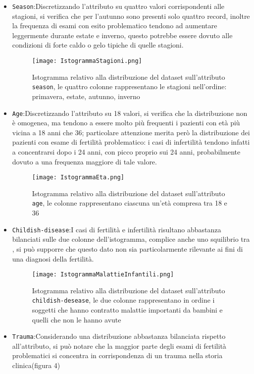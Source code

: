 \begin{itemize}
	\item \texttt{Season}:Discretizzando l'attributo su quattro valori corrispondenti alle stagioni, si verifica che per l'autunno sono presenti solo quattro record, inoltre la frequenza di esami con esito problematico tendono ad aumentare leggermente durante estate e inverno, questo potrebbe essere dovuto alle condizioni di forte caldo o gelo tipiche di quelle stagioni.
	\begin{figure}[H]
		\texttt{[image: IstogrammaStagioni.png]}
		\caption{Istogramma relativo alla distribuzione del dataset sull'attributo \texttt{season}, le quattro colonne rappresentano le stagioni nell'ordine: primavera, estate, autunno, inverno}
	\end{figure}
	
	\item \texttt{Age}:Discretizzando l'attributo su 18 valori, si verifica che la distribuzione non è omogenea, ma tendono a essere molto più frequenti i pazienti con età più vicina a 18 anni che  36; particolare attenzione merita però la distribuzione dei pazienti con esame di fertilità problematico: i casi di infertilità tendono infatti a concentrarsi dopo i 24 anni, con picco proprio sui 24 anni, probabilmente dovuto a una frequenza maggiore di tale valore.
	
		\begin{figure}[H]
		\texttt{[image: IstogrammaEta.png]}
		\caption{Istogramma relativo alla distribuzione del dataset sull'attributo \texttt{age}, le colonne rappresentano ciascuna un'età compresa tra 18 e 36}
	\end{figure}
	
	\item \texttt{Childish-disease}:I casi di fertilità e infertilità risultano abbastanza bilanciati sulle due colonne dell'istogramma, complice anche uno squilibrio tra , si può supporre che questo dato non sia particolarmente rilevante ai fini di una diagnosi della fertilità. 
	
	\begin{figure}[H]
		\texttt{[image: IstogrammaMalattieInfantili.png]}
		\caption{Istogramma relativo alla distribuzione del dataset sull'attributo \texttt{childish-desease}, le due colonne rappresentano in ordine i soggetti che hanno contratto malattie importanti da bambini e quelli che non le hanno avute}
	\end{figure}
	
	\item \texttt{Trauma}:Considerando una distribuzione abbastanza bilanciata rispetto all'attributo, si può notare che la maggior parte degli esami di fertilità problematici si concentra in corrispondenza di un trauma nella storia clinica(figura 4)	
	

\end{itemize}
